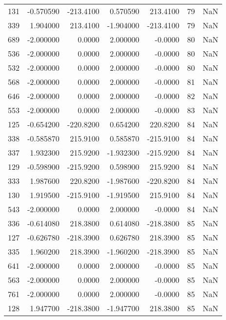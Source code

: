 \begin{tabular}{rrrrrrr}
 131 &   -0.570590 & -213.4100 &    0.570590 &    213.4100 &          79 & NaN \\
 339 &    1.904000 &  213.4100 &   -1.904000 &   -213.4100 &          79 & NaN \\
 689 &   -2.000000 &    0.0000 &    2.000000 &     -0.0000 &          80 & NaN \\
 536 &   -2.000000 &    0.0000 &    2.000000 &     -0.0000 &          80 & NaN \\
 532 &   -2.000000 &    0.0000 &    2.000000 &     -0.0000 &          80 & NaN \\
 568 &   -2.000000 &    0.0000 &    2.000000 &     -0.0000 &          81 & NaN \\
 646 &   -2.000000 &    0.0000 &    2.000000 &     -0.0000 &          82 & NaN \\
 553 &   -2.000000 &    0.0000 &    2.000000 &     -0.0000 &          83 & NaN \\
 125 &   -0.654200 & -220.8200 &    0.654200 &    220.8200 &          84 & NaN \\
 338 &   -0.585870 &  215.9100 &    0.585870 &   -215.9100 &          84 & NaN \\
 337 &    1.932300 &  215.9200 &   -1.932300 &   -215.9200 &          84 & NaN \\
 129 &   -0.598900 & -215.9200 &    0.598900 &    215.9200 &          84 & NaN \\
 333 &    1.987600 &  220.8200 &   -1.987600 &   -220.8200 &          84 & NaN \\
 130 &    1.919500 & -215.9100 &   -1.919500 &    215.9100 &          84 & NaN \\
 543 &   -2.000000 &    0.0000 &    2.000000 &     -0.0000 &          84 & NaN \\
 336 &   -0.614080 &  218.3800 &    0.614080 &   -218.3800 &          85 & NaN \\
 127 &   -0.626780 & -218.3900 &    0.626780 &    218.3900 &          85 & NaN \\
 335 &    1.960200 &  218.3900 &   -1.960200 &   -218.3900 &          85 & NaN \\
 641 &   -2.000000 &    0.0000 &    2.000000 &     -0.0000 &          85 & NaN \\
 563 &   -2.000000 &    0.0000 &    2.000000 &     -0.0000 &          85 & NaN \\
 761 &   -2.000000 &    0.0000 &    2.000000 &     -0.0000 &          85 & NaN \\
 128 &    1.947700 & -218.3800 &   -1.947700 &    218.3800 &          85 & NaN \\

\end{tabular}
